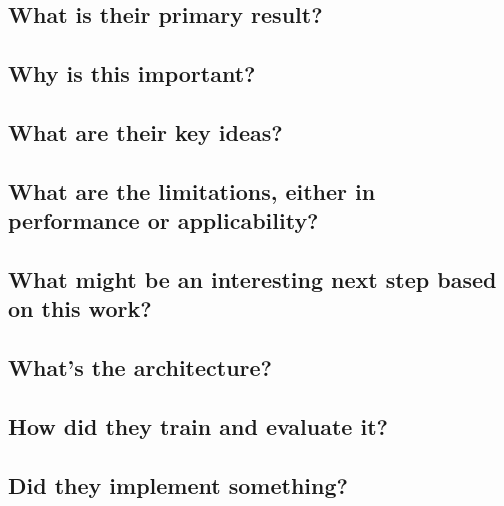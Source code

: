 \subsection{What is their primary result?}

\subsection{Why is this important?}

\subsection{What are their key ideas?}

\subsection{What are the limitations, either in performance or applicability?}

\subsection{What might be an interesting next step based on this work?}

\subsection{What's the architecture?}

\subsection{How did they train and evaluate it?}

\subsection{Did they implement something?}

